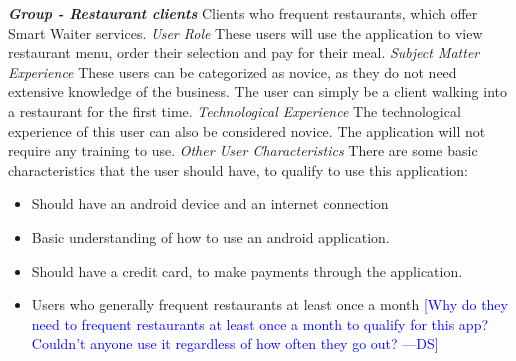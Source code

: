 \documentclass[12pt, titlepage]{article}
\newcommand{\authornote}[3]{\textcolor{#1}{[#3 ---#2]}}
\newcommand{\authornote}[3]{}
\newcommand{\ds}[1]{\authornote{blue}{DS}{#1}}
\begin{document}
\textbf{\textit{Group - Restaurant clients}}\newline
Clients who frequent restaurants, which offer Smart Waiter services.\newline
\newline
\textit{User Role}\newline
These users will use the application to view restaurant menu, order their selection and pay for their meal.\newline\newline
\textit{Subject Matter Experience}\newline
These users can be categorized as novice, as they do not need extensive knowledge of the business. The user can simply be a client walking into a restaurant for the first time.\newline\newline
\textit{Technological Experience}\newline
The technological experience of this user can also be considered novice. The application will not require any training to use.\newline\newline
\textit{Other User Characteristics}\newline
There are some basic characteristics that the user should have, to qualify to use this application:
\begin{itemize}
  \item Should have an android device and an internet connection
  \item Basic understanding of how to use an android application. 
  \item 	Should have a credit card, to make payments through the application. 
  \item 	Users who generally frequent restaurants at least once a month \ds{Why do they need to frequent restaurants at least once a month to qualify for this app? Couldn't anyone use it regardless of how often they go out?}
\end{itemize}
\end{document}
